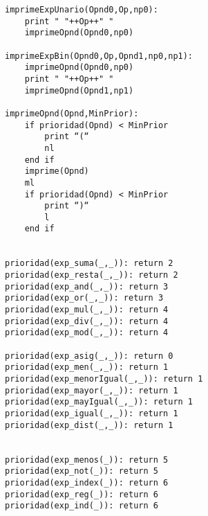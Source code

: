\begin{lstlisting}
imprimeExpUnario(Opnd0,Op,np0):
    print " "++Op++" "
    imprimeOpnd(Opnd0,np0)
       
imprimeExpBin(Opnd0,Op,Opnd1,np0,np1):
    imprimeOpnd(Opnd0,np0)
    print " "++Op++" "
    imprimeOpnd(Opnd1,np1)
    
imprimeOpnd(Opnd,MinPrior):
    if prioridad(Opnd) < MinPrior
        print “(“
        nl
    end if
    imprime(Opnd)
    ml
    if prioridad(Opnd) < MinPrior
        print “)“
        l
    end if    


prioridad(exp_suma(_,_)): return 2
prioridad(exp_resta(_,_)): return 2
prioridad(exp_and(_,_)): return 3
prioridad(exp_or(_,_)): return 3
prioridad(exp_mul(_,_)): return 4
prioridad(exp_div(_,_)): return 4
prioridad(exp_mod(_,_)): return 4

prioridad(exp_asig(_,_)): return 0
prioridad(exp_men(_,_)): return 1
prioridad(exp_menorIgual(_,_)): return 1
prioridad(exp_mayor(_,_)): return 1
prioridad(exp_mayIgual(_,_)): return 1
prioridad(exp_igual(_,_)): return 1
prioridad(exp_dist(_,_)): return 1


prioridad(exp_menos(_)): return 5
prioridad(exp_not(_)): return 5
prioridad(exp_index(_)): return 6
prioridad(exp_reg(_)): return 6
prioridad(exp_ind(_)): return 6




\end{lstlisting}